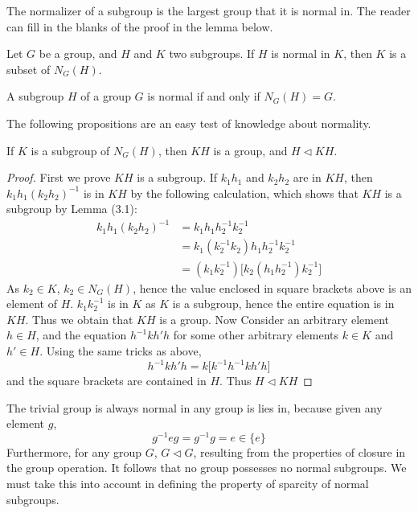 The normalizer of a subgroup is the largest group that it is normal in. The reader can fill in the blanks of the proof in the lemma below.

\begin{lemma}
    Let $G$ be a group, and $H$ and $K$ two subgroups. If $H$ is normal in $K$, then $K$ is a subset of $N_G(H)$.
\end{lemma}

\begin{corollary}
    A subgroup $H$ of a group $G$ is normal if and only if $N_G(H) = G$.
\end{corollary}

The following propositions are an easy test of knowledge about normality.

\begin{theorem}
    If $K$ is a subgroup of $N_G(H)$, then $KH$ is a group, and $H \lhd KH$.
\end{theorem}
\begin{proof}
    First we prove $KH$ is a subgroup. If $k_1h_1$ and $k_2h_2$ are in $KH$, then $k_1h_1(k_2h_2)^{-1}$ is in $KH$ by the following calculation, which shows that $KH$ is a subgroup by Lemma (3.1):
    \begin{align*}
    k_1h_1(k_2h_2)^{-1} &= k_1h_1h_2^{-1}k_2^{-1}\\
                        &= k_1(k_2^{-1}k_2)h_1h_2^{-1}k_2^{-1}\\
                        &= (k_1k_2^{-1})\big[ k_2(h_1h_2^{-1})k_2^{-1} \big]
    \end{align*}
    As $k_2 \in K$, $k_2 \in N_G(H)$, hence the value enclosed in square brackets above is an element of $H$. $k_1k_2^{-1}$ is in $K$ as $K$ is a subgroup, hence the entire equation is in $KH$. Thus we obtain that $KH$ is a group. Now Consider an arbitrary element $h \in H$, and the equation $h^{-1}kh'h$ for some other arbitrary elements $k \in K$ and $h' \in H$. Using the same tricks as above,
    \[ h^{-1}kh'h = k \big[ k^{-1}h^{-1}kh'h \big] \]
    and the square brackets are contained in $H$. Thus $H \lhd KH$
\end{proof}

The trivial group is always normal in any group is lies in, because given any element $g$,
%
\[ g^{-1}eg = g^{-1}g = e \in \{e\} \]
%
Furthermore, for any group $G$, $G \lhd G$, resulting from the properties of closure in the group operation. It follows that no group possesses no normal subgroups. We must take this into account in defining the property of sparcity of normal subgroups.

